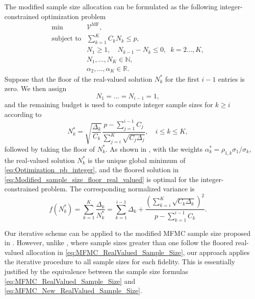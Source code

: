 The modified sample size allocation can be formulated as the following integer-constrained optimization problem
%
\begin{equation}\label{eq:Optimization_pb_integer}
    \begin{array}{ll}
    \min  &\mathcal{V}^{\text{MF}},\\
       \text{subject to} &\displaystyle\sum\limits_{k=1}^K C_kN_k\le p,\\[2pt]
       &\displaystyle N_1\ge 1,\quad \displaystyle N_{k-1}-N_k\le 0, \;\; k=2\ldots,K,\\
       &N_1,\ldots, N_K\in \mathbb{N},\\
       &\alpha_2,\ldots,\alpha_K\in \mathbb{R}.
    \end{array}
\end{equation}
%
Suppose that the floor of the real-valued solution $N_k^*$ for the first $i-1$ entries is zero. We then assign 
\[
N_1 = \ldots = N_{i-1} = 1,
\] 
and the remaining budget is used to compute integer sample sizes for $k \ge i$ according to
%
\begin{equation}
    \label{eq:Modified_sample_size_floor_real_valued}
    N_k^* = \sqrt{\frac{\Delta_k}{C_k}}\frac{p - \sum_{j=1}^{i-1} C_j}{\sum_{j=i}^{K} \sqrt{C_j \Delta_j}}, \quad i \le k \le K,
\end{equation}
%
followed by taking the floor of $N_k^*$. As shown in \cite{GrGuJuWa:2023}, with the weights $\alpha_k^* = \rho_{1,k} \sigma_1 / \sigma_k$, the real-valued solution $N_k^*$ is the unique global minimum of \eqref{eq:Optimization_pb_integer}, and the floored solution in \eqref{eq:Modified_sample_size_floor_real_valued} is optimal for the integer-constrained problem. The corresponding normalized variance is
%
\begin{equation}\label{eq:Modified_f_real_valued}
    f(N_k^*) = \sum_{k=1}^K \frac{\Delta_k}{N_k^*} = \sum_{k=1}^{i-1} \Delta_k + \frac{\left(\sum_{k=i}^K \sqrt{C_k \Delta_k}\right)^2}{p - \sum_{k=1}^{i-1} C_k}.
\end{equation}


Our iterative scheme can be applied to the modified MFMC sample size proposed in \cite{GrGuJuWa:2023}. However, unlike \cite{GrGuJuWa:2023}, where sample sizes greater than one follow the floored real-valued allocation in \eqref{eq:MFMC_RealValued_Sample_Size}, our approach applies the iterative procedure to all sample sizes for each fidelity. This is essentially justified by the equivalence between the sample size formulas \eqref{eq:MFMC_RealValued_Sample_Size} and \eqref{eq:MFMC_New_RealValued_Sample_Size}.



